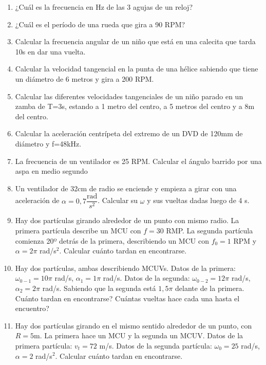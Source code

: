 \begin{enumerate}[label=\arabic*)]

\item ¿Cuál es la frecuencia en Hz de las 3 agujas de un reloj? %

\item ¿Cuál es el período de una rueda que gira a 90 RPM? %

\item Calcular la frecuencia angular de un niño que está en una calecita que tarda 10s en dar una vuelta. %

\item Calcular la velocidad tangencial en la punta de una hélice sabiendo que tiene un diámetro de 6 metros y gira a 200 RPM.

\item Calcular las diferentes velocidades tangenciales de un niño parado en un zamba de T=3s, estando a 1 metro del centro, a 5 metros del centro y a 8m del centro.

\item Calcular la aceleración centrípeta del extremo de un DVD de 120mm de diámetro y f=48kHz.

\item La frecuencia de un ventilador es 25 RPM.
Calcular el ángulo barrido por una aspa en medio segundo

\item Un ventilador de 32cm de radio se enciende y empieza a girar con una aceleración de $\alpha = 0,7 \dfrac{\text{rad}}{s^2}$. Calcular su $\omega$ y sus vueltas dadas luego de 4 s.

\item Hay dos partículas girando alrededor de un punto con mismo radio. La primera partícula describe un MCU con $f = 30$ RMP. La segunda partícula comienza 20º detrás de la primera, describiendo un MCU con $f_0 = 1$ RPM y $\alpha =2\pi$ rad/s$^2$. Calcular cuánto tardan en encontrarse.

\item Hay dos partículas, ambas describiendo MCUVs. Datos de la primera: $\omega_{0-1}=10\pi$ rad/s, $\alpha_1=1\pi$ rad/s. Datos de la segunda: $\omega_{0-2}=12\pi$ rad/s, $\alpha_2=2\pi$ rad/s. Sabiendo que la segunda está $1,5\pi$ delante de la primera. Cuánto tardan en encontrarse? Cuántas vueltas hace cada una hasta el encuentro?

\item Hay dos partículas girando en el mismo sentido alrededor de un punto, con $R=5$m. La primera hace un MCU y la segunda un MCUV. Datos de la primera partícula: $v_t=72$ m/s. Datos de la segunda partícula: $\omega_0=25$ rad/s, $\alpha= 2$ rad/s$^2$. Calcular cuánto tardan en encontrarse.


\end{enumerate}
